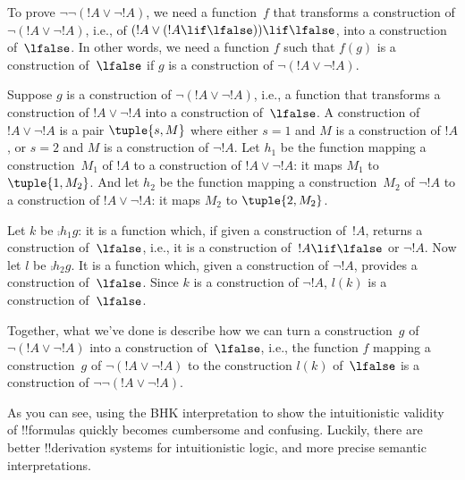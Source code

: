 \documentclass[../../../include/open-logic-section]{subfiles}
\begin{document}
\begin{ex}
To prove $\lnot \lnot (!A \lor \lnot !A)$, we need a function~$f$ that
transforms a construction of $\lnot(!A \lor \lnot !A)$, i.e., of $(!A
\lor (!A \lif \lfalse)) \lif \lfalse$, into a construction
of~$\lfalse$.  In other words, we need a function $f$ such that $f(g)$
is a construction of~$\lfalse$ if $g$ is a construction of $\lnot(!A
\lor \lnot !A)$.

Suppose $g$ is a construction of $\lnot(!A \lor \lnot !A)$, i.e., a
function that transforms a construction of $!A \lor \lnot !A$ into a
construction of~$\lfalse$.  A construction of $!A \lor \lnot !A$ is a
pair $\tuple{s, M}$ where either $s = 1$ and $M$ is a construction of
$!A$, or $s = 2$ and $M$ is a construction of $\lnot !A$. Let $h_1$ be
the function mapping a construction~$M_1$ of $!A$ to a construction of
$!A \lor \lnot !A$: it maps $M_1$ to $\tuple{1, M_2}$. And let $h_2$
be the function mapping a construction~$M_2$ of $\lnot !A$ to a
construction of $!A \lor \lnot !A$: it maps $M_2$ to $\tuple{2, M_2}$.

Let $k$ be $\comp{h_1}{g}$: it is a function which, if given a
construction of~$!A$, returns a construction of~$\lfalse$, i.e., it is
a construction of~$!A \lif \lfalse$ or $\lnot !A$. Now let $l$ be
$\comp{h_2}{g}$. It is a function which, given a construction of
$\lnot !A$, provides a construction of~$\lfalse$. Since $k$ is a
construction of $\lnot !A$, $l(k)$ is a construction of~$\lfalse$.

Together, what we've done is describe how we can turn a
construction~$g$ of $\lnot(!A \lor \lnot !A)$ into a construction
of~$\lfalse$, i.e., the function $f$ mapping a construction~$g$ of
$\lnot(!A \lor \lnot !A)$ to the construction $l(k)$ of~$\lfalse$ is a
construction of $\lnot\lnot(!A \lor \lnot !A)$.
\end{ex}

As you can see, using the BHK interpretation to show the
intuitionistic validity of !!{formula}s quickly becomes cumbersome
and confusing. Luckily, there are better !!{derivation} systems for
intuitionistic logic, and more precise semantic interpretations.
\end{document}
